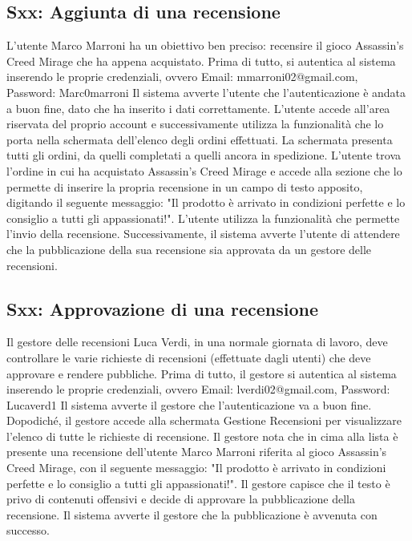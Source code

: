 \documentclass[12pt, a4paper, oneside]{book}
\begin{document}
    \subsection*{Sxx: Aggiunta di una recensione}
    L'utente Marco Marroni ha un obiettivo ben preciso: recensire il gioco Assassin's Creed Mirage che ha appena acquistato.
    Prima di tutto, si autentica al sistema inserendo le proprie credenziali, ovvero Email: mmarroni02@gmail.com, Password: Marc0marroni
    Il sistema avverte l'utente che l'autenticazione è andata a buon fine, dato che ha inserito i dati correttamente.
    L'utente accede all'area riservata del proprio account e successivamente utilizza la funzionalità
    che lo porta nella schermata dell'elenco degli ordini effettuati. La schermata presenta tutti gli ordini,
    da quelli completati a quelli ancora in spedizione. L'utente trova l'ordine in cui ha acquistato
    Assassin's Creed Mirage e accede alla sezione che lo permette di inserire la propria recensione
    in un campo di testo apposito, digitando il seguente messaggio: "Il prodotto è arrivato in condizioni perfette
    e lo consiglio a tutti gli appassionati!". L'utente utilizza la funzionalità che permette l'invio della recensione.
    Successivamente, il sistema avverte l'utente di attendere che la pubblicazione della sua recensione sia approvata
    da un gestore delle recensioni.

    \subsection*{Sxx: Approvazione di una recensione}
    Il gestore delle recensioni Luca Verdi, in una normale giornata di lavoro, deve controllare le varie richieste
    di recensioni (effettuate dagli utenti) che deve approvare e rendere pubbliche.
    Prima di tutto, il gestore si autentica al sistema inserendo le proprie credenziali, ovvero Email: lverdi02@gmail.com, Password: Lucaverd1
    Il sistema avverte il gestore che l'autenticazione va a buon fine. Dopodiché, il gestore accede alla schermata
    Gestione Recensioni per visualizzare l'elenco di tutte le richieste di recensione. Il gestore nota che in cima
    alla lista è presente una recensione dell'utente Marco Marroni riferita al gioco Assassin's Creed Mirage,
    con il seguente messaggio: "Il prodotto è arrivato in condizioni perfette e lo consiglio a tutti gli appassionati!".
    Il gestore capisce che il testo è privo di contenuti offensivi e decide di approvare la pubblicazione della recensione.
    Il sistema avverte il gestore che la pubblicazione è avvenuta con successo.
\end{document}
